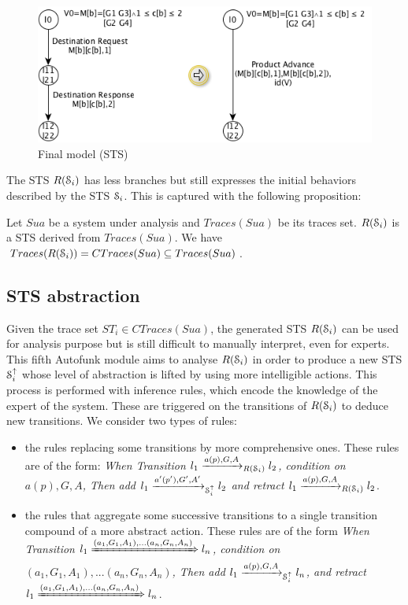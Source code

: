 \begin{figure}[ht]
  \includegraphics[width=1.0\linewidth]{figures/STSfinal.png}

	\caption{Final model (STS)}
	\label{fig:finalmodel}
\end{figure}

The STS $R(\EuScript{S}_i)$ has less branches but still expresses
the initial behaviors described by the STS $\EuScript{S}_i$.
This is captured with the following proposition:

\begin{proposition}
  Let $\mathit{Sua}$ be a system under analysis and $Traces(Sua)$ be its traces
  set. $R(\EuScript{S}_i)$ is a STS derived from $Traces(Sua)$.
  We have $Traces(R(\EuScript{S}_i)) = CTraces(Sua) \subseteq Traces(Sua)$.
\end{proposition}

\subsection{STS abstraction}

Given the trace set $ST_i \in CTraces(Sua)$, the generated STS
$R(\EuScript{S}_i)$ can be used for analysis purpose but is still
difficult to manually interpret, even for experts.  This fifth
Autofunk module aims to analyse $R(\EuScript{S}_i)$ in order to
produce a new STS $\EuScript{S}_i^\uparrow$ whose level of
abstraction is lifted by using more intelligible actions. This
process is performed with inference rules, which encode the
knowledge of the expert of the system. These are triggered on the
transitions of $R(\EuScript{S}_i)$ to deduce new transitions. We
consider two types of rules:

\begin{itemize}
    \item the rules replacing some transitions by more
    comprehensive ones. These rules are of the form: \textit{When
    Transition $l_1 \xrightarrow{a(p),G,A}_{R(\EuScript{S}_i)}
    l_2$, condition on $a(p),G,A$, Then add $l_1
    \xrightarrow{a'(p'),G',A'}_{\EuScript{S}_i^\uparrow} l_2$ and
    retract $l_1 \xrightarrow{a(p),G,A}_{R(\EuScript{S}_i)} l_2$}.

    \item the rules that aggregate some successive transitions
    to a single transition compound of a more abstract action.
    These rules are of the form \textit{When Transition $l_1
    \xRightarrow{(a_1,G_1,A_1),...(a_n,G_n,A_n)} l_n$, condition
    on $(a_1,G_1,A_1),...(a_n,G_n,A_n)$, Then add $l_1
    \xrightarrow{a(p),G,A}_{\EuScript{S}_i^\uparrow} l_n $, and
    retract $l_1 \xRightarrow{(a_1,G_1,A_1),...(a_n,G_n,A_n)} l_n$}.
\end{itemize}

